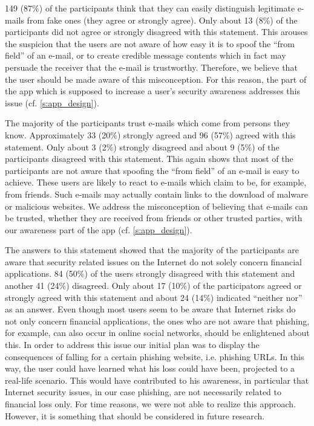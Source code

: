 \begin{description}[leftmargin=0cm]
	\item[Self-Assessment - Distinguish legitimate from illegitimate e-mails:] 149 (87\%) of the participants think that they can easily distinguish legitimate e-mails from fake ones (they agree or strongly agree).
 Only about 13 (8\%) of the participants did not agree or strongly disagreed with this statement.
 This arouses the suspicion that the users are not aware of how easy it is to spoof the ``from field'' of an e-mail, or to create credible message contents which in fact may persuade the receiver that the e-mail is trustworthy.
Therefore, we believe that the user should be made aware of this misconception.
For this reason, the part of the app which is supposed to increase a user's security awareness addresses this issue (cf. \autoref{s:app_design}).
	
	\item[Self-Assessment - Trust in e-mails from known parties:] The majority of the participants trust e-mails which come from persons they know.
 Approximately 33 (20\%) strongly agreed and 96 (57\%) agreed with this statement.
 Only about 3 (2\%) strongly disagreed and about 9 (5\%) of the participants disagreed with this statement.
 This again shows that most of the participants are not aware that spoofing the ``from field'' of an e-mail is easy to achieve.
 These users are likely to react to e-mails which claim to be, for example, from friends.
 Such e-mails may actually contain links to the download of malware or malicious websites.
We address the misconception of believing that e-mails can be trusted, whether they are received from friends or other trusted parties, with our awareness part of the app (cf. \autoref{s:app_design}).


	\item[Self-Assessment - Internet security is only related to financial applications:] The answers to this statement showed that the majority of the participants are aware that security related issues on the Internet do not solely concern financial applications.
 84 (50\%) of the users strongly disagreed with this statement and another 41 (24\%) disagreed.
 Only about 17 (10\%) of the participators agreed or strongly agreed with this statement and about 24 (14\%) indicated ``neither nor'' as an answer.
 Even though most users seem to be aware that Internet risks do not only concern financial applications, the ones who are not aware that phishing, for example, can also occur in online social networks, should be enlightened about this.
 In order to address this issue our initial plan was to display the consequences of falling for a certain phishing website, i.e. phishing URLs. In this way, the user could have learned what his loss could have been, projected to a real-life scenario.
 This would have contributed to his awareness, in particular that Internet security issues, in our case phishing, are not necessarily related to financial loss only.
 For time reasons, we were not able to realize this approach. However, it is something that should be considered in future research.



\end{description}
